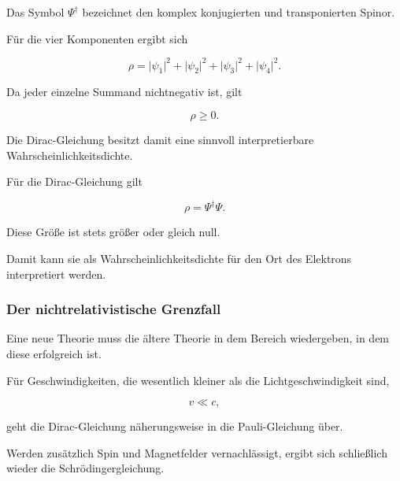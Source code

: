 Das Symbol \(\Psi^\dagger\) bezeichnet den komplex konjugierten und
transponierten Spinor.

Für die vier Komponenten ergibt sich

\begin{equation}
	\rho
	=
	\lvert\psi_1\rvert^2
	+
	\lvert\psi_2\rvert^2
	+
	\lvert\psi_3\rvert^2
	+
	\lvert\psi_4\rvert^2.
	\label{eq:wahrscheinlichkeitsdichte_dirac_komponenten}
\end{equation}

Da jeder einzelne Summand nichtnegativ ist, gilt

\begin{equation}
	\rho
	\geq
	0.
\end{equation}

Die Dirac-Gleichung besitzt damit eine sinnvoll interpretierbare
Wahrscheinlichkeitsdichte.

\begin{PhysicsBox}
	\label{box:positive_wahrscheinlichkeitsdichte_dirac}
	
	Für die Dirac-Gleichung gilt
	
	\begin{equation}
		\rho
		=
		\Psi^\dagger\Psi.
	\end{equation}
	
	Diese Größe ist stets größer oder gleich null.
	
	Damit kann sie als Wahrscheinlichkeitsdichte für den Ort des Elektrons
	interpretiert werden.
\end{PhysicsBox}

\subsubsection*{Der nichtrelativistische Grenzfall}

Eine neue Theorie muss die ältere Theorie in dem Bereich wiedergeben,
in dem diese erfolgreich ist.

Für Geschwindigkeiten, die wesentlich kleiner als die
Lichtgeschwindigkeit sind,

\begin{equation}
	v
	\ll
	c,
\end{equation}

geht die Dirac-Gleichung näherungsweise in die
Pauli-Gleichung
über.

Werden zusätzlich Spin und Magnetfelder vernachlässigt, ergibt sich
schließlich wieder die Schrödingergleichung.

